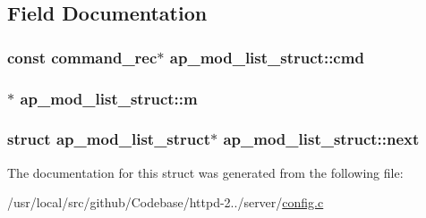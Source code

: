 \subsection{Field Documentation}
\subsubsection[{\texorpdfstring{cmd}{cmd}}]{\setlength{\rightskip}{0pt plus 5cm}const {\bf command\+\_\+rec}$\ast$ ap\+\_\+mod\+\_\+list\+\_\+struct\+::cmd}\hypertarget{structap__mod__list__struct_adaebd57a879c2622e36fb33bad59f290}{}\label{structap__mod__list__struct_adaebd57a879c2622e36fb33bad59f290}
\subsubsection[{\texorpdfstring{m}{m}}]{$\ast$ ap\+\_\+mod\+\_\+list\+\_\+struct\+::m}\hypertarget{structap__mod__list__struct_a9b377e9f5acc85df2bf8fa59d61ea85a}{}\label{structap__mod__list__struct_a9b377e9f5acc85df2bf8fa59d61ea85a}
\subsubsection[{\texorpdfstring{next}{next}}]{\setlength{\rightskip}{0pt plus 5cm}struct {\bf ap\+\_\+mod\+\_\+list\+\_\+struct}$\ast$ ap\+\_\+mod\+\_\+list\+\_\+struct\+::next}\hypertarget{structap__mod__list__struct_a5d9956f476d3f04d9def380f65e986b5}{}\label{structap__mod__list__struct_a5d9956f476d3f04d9def380f65e986b5}


The documentation for this struct was generated from the following file\+:\begin{DoxyCompactItemize}
\item 
/usr/local/src/github/\+Codebase/httpd-\/2../server/\hyperlink{config_8c}{config.\+c}\end{DoxyCompactItemize}
